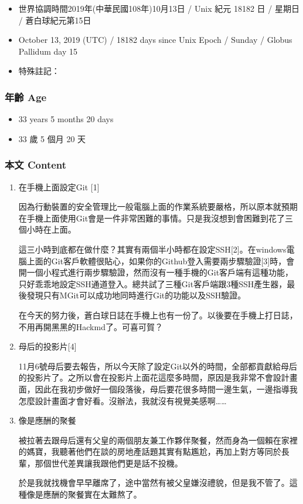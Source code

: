 \documentclass[a5paper, 12pt
]{book}
\providecommand{\tightlist}{%
  \setlength{\itemsep}{0pt}\setlength{\parskip}{0pt}}
\begin{document}
\begin{itemize}
\tightlist
\item
  世界協調時間2019年(中華民國108年)10月13日 / Unix 紀元 18182 日 /
  星期日 / 蒼白球紀元第15日
\item
  October 13, 2019 (UTC) / 18182 days since Unix Epoch / Sunday / Globus
  Pallidum day 15
\item
  特殊註記：
\end{itemize}

\hypertarget{ux5e74ux9f61-age-14}{%
\subsubsection{年齡 Age}\label{ux5e74ux9f61-age-14}}

\begin{itemize}
\tightlist
\item
  33 years 5 months 20 days
\item
  33 歲 5 個月 20 天
\end{itemize}

\hypertarget{ux672cux6587-content-14}{%
\subsubsection{本文 Content}\label{ux672cux6587-content-14}}

\begin{enumerate}
\def\labelenumi{\arabic{enumi}.}
\item
  在手機上面設定Git {[}1{]}

  因為行動裝置的安全管理比一般電腦上面的作業系統要嚴格，所以原本就預期在手機上面使用Git會是一件非常困難的事情。只是我沒想到會困難到花了三個小時在上面。

  這三小時到底都在做什麼？其實有兩個半小時都在設定SSH{[}2{]}。在windows電腦上面的Git客戶軟體很貼心，如果你的Github登入需要兩步驟驗證{[}3{]}時，會開一個小程式進行兩步驟驗證，然而沒有一種手機的Git客戶端有這種功能，只好乖乖地設定SSH通道登入。總共試了三種Git客戶端跟3種SSH產生器，最後發現只有MGit可以成功地同時進行Git的功能以及SSH驗證。

  在今天的努力後，蒼白球日誌在手機上也有一份了。以後要在手機上打日誌，不用再開黑黑的Hackmd了。可喜可賀？
\item
  母后的投影片{[}4{]}

  11月6號母后要去報告，所以今天除了設定Git以外的時間，全部都貢獻給母后的投影片了。之所以會在投影片上面花這麼多時間，原因是我非常不會設計畫面，因此在我初步做好一個段落後，母后要花很多時間一邊生氣，一邊指導我怎麼設計畫面才會好看。沒辦法，我就沒有視覺美感啊\ldots\ldots{}
\item
  像是應酬的聚餐

  被拉著去跟母后還有父皇的兩個朋友兼工作夥伴聚餐，然而身為一個賴在家裡的媽寶，我聽著他們在談的房地產話題其實有點尷尬，再加上對方等同於長輩，那個世代差異讓我跟他們更是話不投機。

  於是我就找機會早早離席了，途中當然有被父皇嫌沒禮貌，但是我不管了。這種像是應酬的聚餐實在太難熬了。
\end{enumerate}
\end{document}
